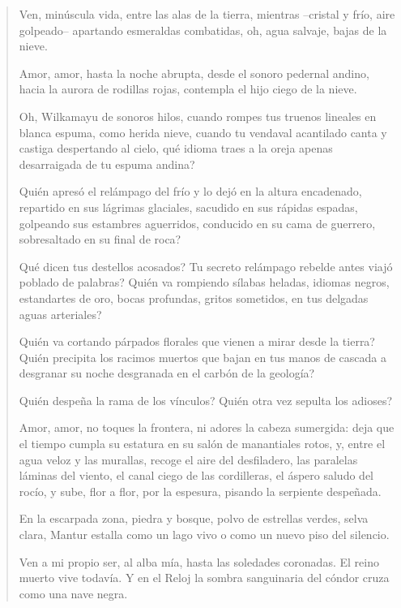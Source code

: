 \documentclass[12pt]{article}
\begin{document}
\begin{verse}
Ven, minúscula vida, entre las alas  
de la tierra, mientras --cristal y frío, aire golpeado--  
apartando esmeraldas combatidas,  
oh, agua salvaje, bajas de la nieve.  
	
Amor, amor, hasta la noche abrupta,  
desde el sonoro pedernal andino,  
hacia la aurora de rodillas rojas,  
contempla el hijo ciego de la nieve.  
	
Oh, Wilkamayu de sonoros hilos,  
cuando rompes tus truenos lineales  
en blanca espuma, como herida nieve,  
cuando tu vendaval acantilado  
canta y castiga despertando al cielo,  
qué idioma traes a la oreja apenas  
desarraigada de tu espuma andina?  
	
Quién apresó el relámpago del frío  
y lo dejó en la altura encadenado,  
repartido en sus lágrimas glaciales,  
sacudido en sus rápidas espadas,  
golpeando sus estambres aguerridos,  
conducido en su cama de guerrero,  
sobresaltado en su final de roca?  
	
Qué dicen tus destellos acosados?  
Tu secreto relámpago rebelde  
antes viajó poblado de palabras?  
Quién va rompiendo sílabas heladas,  
idiomas negros, estandartes de oro,  
bocas profundas, gritos sometidos,  
en tus delgadas aguas arteriales?  
	
Quién va cortando párpados florales  
que vienen a mirar desde la tierra?  
Quién precipita los racimos muertos  
que bajan en tus manos de cascada  
a desgranar su noche desgranada  
en el carbón de la geología?  
	
Quién despeña la rama de los vínculos?  
Quién otra vez sepulta los adioses?  
	
Amor, amor, no toques la frontera,  
ni adores la cabeza sumergida:  
deja que el tiempo cumpla su estatura  
en su salón de manantiales rotos,  
y, entre el agua veloz y las murallas,  
recoge el aire del desfiladero,  
las paralelas láminas del viento,  
el canal ciego de las cordilleras,  
el áspero saludo del rocío,  
y sube, flor a flor, por la espesura,  
pisando la serpiente despeñada.  
	
En la escarpada zona, piedra y bosque,  
polvo de estrellas verdes, selva clara,  
Mantur estalla como un lago vivo  
o como un nuevo piso del silencio.  
	
Ven a mi propio ser, al alba mía,  
hasta las soledades coronadas.  
El reino muerto vive todavía.  
Y en el Reloj la sombra sanguinaria  
del cóndor cruza como una nave negra.  


\end{verse}
\end{document}
